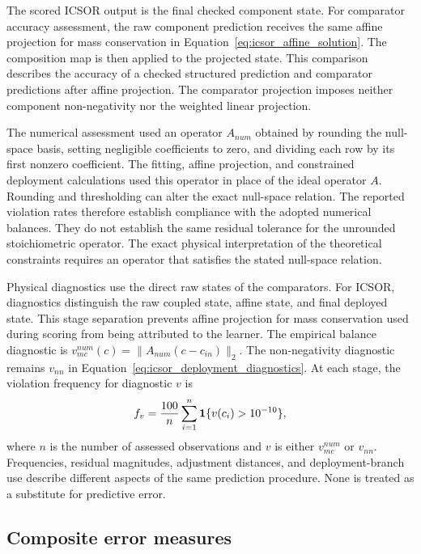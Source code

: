 The scored ICSOR output is the final checked component state. For comparator accuracy assessment, the raw component prediction receives the same affine projection for mass conservation in Equation~\eqref{eq:icsor_affine_solution}. The composition map is then applied to the projected state. This comparison describes the accuracy of a checked structured prediction and comparator predictions after affine projection. The comparator projection imposes neither component non-negativity nor the weighted linear projection.

The numerical assessment used an operator \(A_{num}\) obtained by rounding the null-space basis, setting negligible coefficients to zero, and dividing each row by its first nonzero coefficient. The fitting, affine projection, and constrained deployment calculations used this operator in place of the ideal operator \(A\). Rounding and thresholding can alter the exact null-space relation. The reported violation rates therefore establish compliance with the adopted numerical balances. They do not establish the same residual tolerance for the unrounded stoichiometric operator. The exact physical interpretation of the theoretical constraints requires an operator that satisfies the stated null-space relation.

Physical diagnostics use the direct raw states of the comparators. For ICSOR, diagnostics distinguish the raw coupled state, affine state, and final deployed state. This stage separation prevents affine projection for mass conservation used during scoring from being attributed to the learner. The empirical balance diagnostic is \(v_{mc}^{num}(c)=\|A_{num}(c-c_{in})\|_2\). The non-negativity diagnostic remains \(v_{nn}\) in Equation~\eqref{eq:icsor_deployment_diagnostics}. At each stage, the violation frequency for diagnostic \(v\) is
\begin{equation}
\equationname{Percentage frequency of a physical-constraint violation}
\label{eq:icsor_violation_frequency}
f_v=\frac{100}{n}\sum_{i=1}^{n}
\mathbf{1}\{v(c_i)>10^{-10}\},
\end{equation}
where \(n\) is the number of assessed observations and \(v\) is either \(v_{mc}^{num}\) or \(v_{nn}\). Frequencies, residual magnitudes, adjustment distances, and deployment-branch use describe different aspects of the same prediction procedure. None is treated as a substitute for predictive error.

\subsection{Composite error measures}

